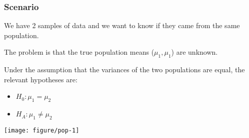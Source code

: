 \documentclass[color=usenames,dvipsnames]{beamer}\usepackage[]{graphicx}\usepackage[]{color}
\makeatletter
\def\maxwidth{ %
  \ifdim\Gin@nat@width>\linewidth
    \linewidth
  \else
    \Gin@nat@width
  \fi
}
\newenvironment{knitrout}{}{} %
\makeatother
\begin{document}
\begin{frame}[fragile]
  \frametitle{Scenario}
  \small
  We have 2 samples of data and we want to know if they came from
  the same population. \\
  \pause
  \vfill

  The problem is that the true population means ($\mu_1, \mu_1$) are
  unknown. \\ %
  \pause
  \vfill

Under the assumption that the variances of the two populations are
equal, the relevant hypotheses are:
\begin{itemize}
  \footnotesize
  \item $H_0: \mu_1 = \mu_2$
  \item $H_A: \mu_1 \neq \mu_2$
\end{itemize}
  \normalsize
  \pause
  \vfill
\begin{knitrout}
\color{fgcolor}
\texttt{[image: figure/pop-1]} 

\end{knitrout}
\end{frame}
\end{document}
